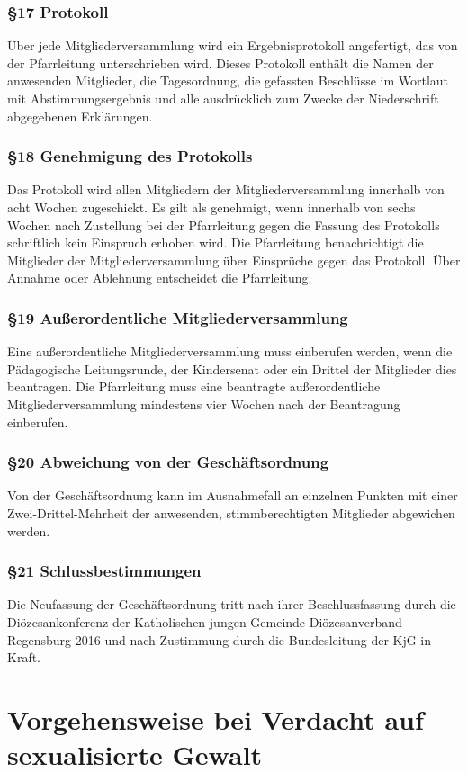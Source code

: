 \documentclass[12pt]{report}
\begin{document}
\begin{flushleft}
\subsection*{§17 Protokoll}
Über jede Mitgliederversammlung wird ein Ergebnisprotokoll angefertigt, das von der Pfarrleitung
unterschrieben wird. Dieses Protokoll enthält die Namen der anwesenden Mitglieder, die Tagesordnung, die
gefassten Beschlüsse im Wortlaut mit Abstimmungsergebnis und alle ausdrücklich zum Zwecke der Niederschrift
abgegebenen Erklärungen.
\subsection*{§18 Genehmigung des Protokolls}
Das Protokoll wird allen Mitgliedern der Mitgliederversammlung innerhalb von acht Wochen zugeschickt. Es
gilt als genehmigt, wenn innerhalb von sechs Wochen nach Zustellung bei der Pfarrleitung gegen die Fassung
des Protokolls schriftlich kein Einspruch erhoben wird. Die Pfarrleitung benachrichtigt die Mitglieder der
Mitgliederversammlung über Einsprüche gegen das Protokoll. Über Annahme oder Ablehnung entscheidet
die Pfarrleitung.
\subsection*{§19 Außerordentliche Mitgliederversammlung}
Eine außerordentliche Mitgliederversammlung muss einberufen werden, wenn die Pädagogische Leitungsrunde,
der Kindersenat oder ein Drittel der Mitglieder dies beantragen. Die Pfarrleitung muss eine beantragte
außerordentliche Mitgliederversammlung mindestens vier Wochen nach der Beantragung einberufen.
\subsection*{§20 Abweichung von der Geschäftsordnung}
Von der Geschäftsordnung kann im Ausnahmefall an einzelnen Punkten mit einer Zwei-Drittel-Mehrheit der
anwesenden, stimmberechtigten Mitglieder abgewichen werden.
\subsection*{§21 Schlussbestimmungen}
Die Neufassung der Geschäftsordnung tritt nach ihrer Beschlussfassung durch die Diözesankonferenz der
Katholischen jungen Gemeinde Diözesanverband Regensburg 2016 und nach Zustimmung durch
die Bundesleitung der KjG in Kraft.


\chapter*{Vorgehensweise bei Verdacht auf sexualisierte Gewalt}

\end{flushleft}
\end{document}
